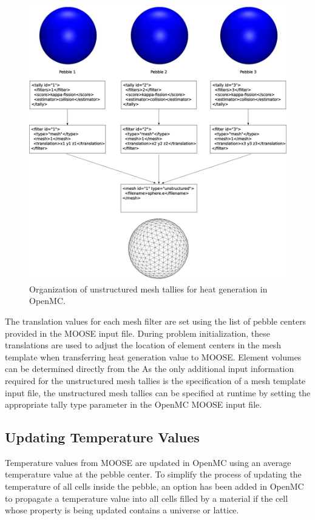 \begin{figure}[ht]
    \centering
    \includegraphics[width=\textwidth]{figures/umesh_tally_diagram}
    \caption{Organization of unstructured mesh tallies for heat generation in OpenMC.}
    \label{fig:umesh_tally_steup}
\end{figure}

The translation values for each mesh filter are set using the list of pebble centers provided in the MOOSE input file. During problem initialization, these translations are used to adjust the location of element centers in the mesh template when transferring heat generation value to MOOSE. Element volumes can be determined directly from the As the only additional input information required for the unstructured mesh tallies is the specification of a mesh template input file, the unstructured mesh tallies can be specified at runtime by setting the appropriate tally type parameter in the OpenMC MOOSE input file.

\subsection{Updating Temperature Values}

Temperature values from MOOSE are updated in OpenMC using an average temperature value at the pebble center. To simplify the process of updating the temperature of all cells inside the pebble, an option has been added in OpenMC to propagate a temperature value into all cells filled by a material if the cell whose property is being updated contains a universe or lattice.
